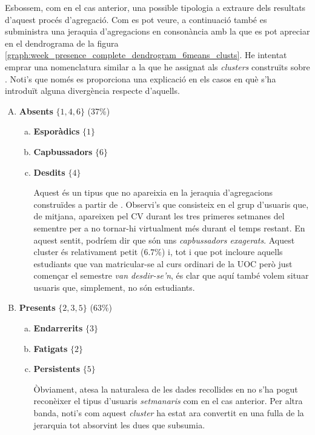 \documentclass[
	a4paper,
	twoside,
	justified
]{tufte-book}
\begin{document}
Esbossem, com en el cas anterior, una possible tipologia a extraure dels resultats d'aquest procés d'agregació. Com es pot veure, a continuació també es subministra una jeraquia d'agregacions en consonància amb la que es pot apreciar en el dendrograma de la figura \ref{graph:week_presence_complete_dendrogram_6means_clusts}. He intentat emprar una nomenclatura similar a la que he assignat als \emph{clusters} construïts sobre . Noti's que només es proporciona una explicació en els casos en què s'ha introduït alguna divergència respecte d'aquells.  

\begin{enumerate}[A.]
\item \textbf{Absents} $\{1,4,6\}$ (37\%)	
	\begin{enumerate}[a.]
	\item \textbf{Esporàdics} $\{1\}$ 
	\item \textbf{Capbussadors} $\{6\}$
	\item \textbf{Desdits} $\{4\}$ 
	
	Aquest és un tipus que no apareixia en la jeraquia d'agregacions construïdes a partir de . Observi's que consisteix en el grup d'usuaris que, de mitjana, apareixen pel CV durant les tres primeres setmanes del sementre per a no tornar-hi virtualment més durant el temps restant. En aquest sentit, podríem dir que són uns \emph{capbussadors exagerats}. Aquest cluster és relativament petit ($6.7\%$) i, tot i que pot incloure aquells estudiants que van matricular-se al curs ordinari de la UOC però just començar el semestre \emph{van desdir-se'n}, és clar que aquí també volem situar usuaris que, simplement, no són estudiants. 
	
	\end{enumerate}
\item \textbf{Presents} $\{2,3,5\}$ ($63\%$)
	\begin{enumerate}[a.]
	\item \textbf{Endarrerits} $\{3\}$
	\item \textbf{Fatigats} $\{2\}$
	\item \textbf{Persistents} $\{5\}$
	
	Òbviament, atesa la naturalesa de les dades recollides en  no s'ha pogut reconèixer el tipus d'usuaris \emph{setmanaris} com en el cas anterior. Per altra banda, noti's com aquest \emph{cluster} ha estat ara convertit en una fulla de la jerarquia tot absorvint les dues que subsumia.  
			
	\end{enumerate}
\end{enumerate} 
     
\end{document}
